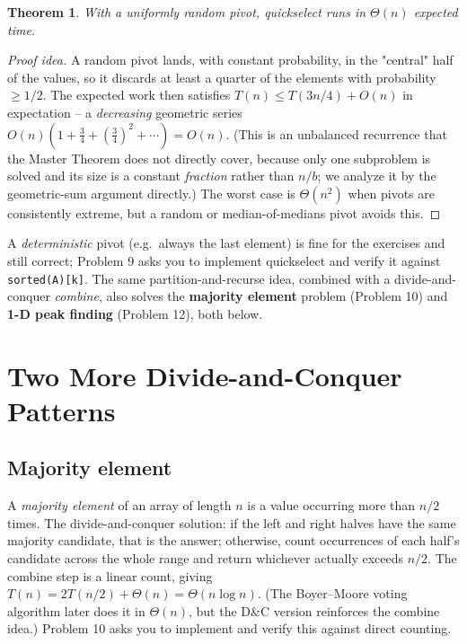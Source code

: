 \documentclass[11pt]{article}
\newtheorem{theorem}{Theorem}[section]
\begin{document}
\begin{theorem}
With a uniformly random pivot, quickselect runs in $\Theta(n)$ \emph{expected} time.
\end{theorem}

\begin{proof}[Proof idea]
A random pivot lands, with constant probability, in the "central" half of the values, so it
discards at least a quarter of the elements with probability $\ge 1/2$. The expected work
then satisfies $T(n) \le T(3n/4) + O(n)$ in expectation -- a \emph{decreasing} geometric
series $O(n)(1 + \tfrac34 + (\tfrac34)^2 + \cdots) = O(n)$. (This is an unbalanced recurrence
that the Master Theorem does not directly cover, because only one subproblem is solved and
its size is a constant \emph{fraction} rather than $n/b$; we analyze it by the geometric-sum
argument directly.) The worst case is $\Theta(n^2)$ when pivots are consistently extreme,
but a random or median-of-medians pivot avoids this.
\end{proof}

A \emph{deterministic} pivot (e.g.\ always the last element) is fine for the exercises and
still correct; Problem 9 asks you to implement quickselect and verify it against
\texttt{sorted(A)[k]}. The same partition-and-recurse idea, combined with a divide-and-
conquer \emph{combine}, also solves the \textbf{majority element} problem (Problem 10) and
\textbf{1-D peak finding} (Problem 12), both below.

\section{Two More Divide-and-Conquer Patterns}

\subsection{Majority element}

A \emph{majority element} of an array of length $n$ is a value occurring more than $n/2$
times. The divide-and-conquer solution: if the left and right halves have the same majority
candidate, that is the answer; otherwise, count occurrences of each half's candidate across
the whole range and return whichever actually exceeds $n/2$. The combine step is a linear
count, giving $T(n) = 2T(n/2) + \Theta(n) = \Theta(n \log n)$. (The Boyer--Moore voting
algorithm later does it in $\Theta(n)$, but the D\&C version reinforces the combine idea.)
Problem 10 asks you to implement and verify this against direct counting.
\end{document}
